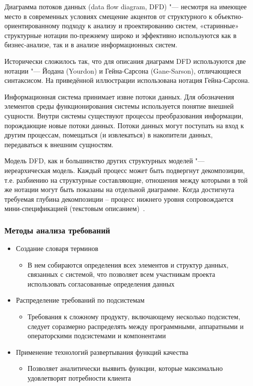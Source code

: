 \documentclass{../industrial-development}
\begin{document}
\lecturenotes

\alert{Диаграмма потоков данных} (data flow diagram, DFD) "--- несмотря на имеющее место в современных условиях смещение акцентов от структурного к объектно-ориентированному подходу к анализу и проектированию систем, «старинные» структурные нотации по-прежнему
широко и эффективно используются как в бизнес-анализе, так и в анализе информационных систем.

Исторически сложилось так, что для описания диаграмм DFD используются две нотации "--- Йодана (Yourdon) и Гейна-Сарсона (Gane-Sarson), отличающиеся синтаксисом. На приведённой иллюстрации использована нотация Гейна-Сарсона.

Информационная система принимает извне потоки данных. Для обозначения элементов среды функционирования системы используется понятие внешней сущности. Внутри системы существуют процессы преобразования информации, порождающие новые потоки данных. Потоки данных могут поступать на вход к другим процессам, помещаться (и извлекаться) в накопители данных, передаваться к внешним сущностям.

Модель DFD, как и большинство других структурных моделей "--- иереархическая модель. Каждый процесс может быть подвергнут декомпозиции, т.е. разбиению на структурные составляющие, отношения между которыми в той же нотации могут быть показаны на отдельной диаграмме. Когда достигнута требуемая глубина декомпозиции – процесс нижнего уровня сопровождается мини-спецификацией (текстовым описанием)~\cite[с.~48-49]{Maglinec}.


\begin{frame} \frametitle{Методы анализа требований}
\begin{itemize}
\item  \alert{Создание словаря терминов}
\begin{itemize}
\item  В нем собираются определения всех элементов и структур данных, связанных с системой, что позволяет всем участникам проекта использовать согласованные определения данных
\end{itemize}
\item \alert{Распределение требований по подсистемам} 
\begin{itemize}
\item Требования к сложному продукту, включающему несколько подсистем, следует соразмерно распределять между программными, аппаратными и операторскими подсистемами и компонентами
\end{itemize}
\item \alert{Применение технологий развертывания функций качества}
\begin{itemize}
\item Позволяет аналитически выявить функции, которые максимально удовлетворят потребности клиента
\end{itemize}
\end{itemize}
\end{frame}
\end{document}
